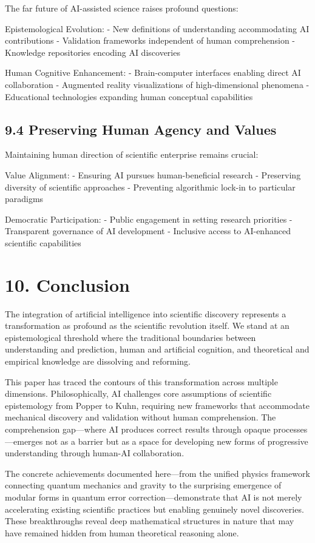 \documentclass{article}
\begin{document}
The far future of AI-assisted science raises profound questions:


Epistemological Evolution:
- New definitions of understanding accommodating AI contributions
- Validation frameworks independent of human comprehension
- Knowledge repositories encoding AI discoveries


Human Cognitive Enhancement:
- Brain-computer interfaces enabling direct AI collaboration
- Augmented reality visualizations of high-dimensional phenomena
- Educational technologies expanding human conceptual capabilities


\subsection{9.4 Preserving Human Agency and Values}

Maintaining human direction of scientific enterprise remains crucial:


Value Alignment:
- Ensuring AI pursues human-beneficial research
- Preserving diversity of scientific approaches
- Preventing algorithmic lock-in to particular paradigms


Democratic Participation:
- Public engagement in setting research priorities
- Transparent governance of AI development
- Inclusive access to AI-enhanced scientific capabilities


\section{10. Conclusion}

The integration of artificial intelligence into scientific discovery represents a transformation as profound as the scientific revolution itself. We stand at an epistemological threshold where the traditional boundaries between understanding and prediction, human and artificial cognition, and theoretical and empirical knowledge are dissolving and reforming.


This paper has traced the contours of this transformation across multiple dimensions. Philosophically, AI challenges core assumptions of scientific epistemology from Popper to Kuhn, requiring new frameworks that accommodate mechanical discovery and validation without human comprehension. The comprehension gap—where AI produces correct results through opaque processes—emerges not as a barrier but as a space for developing new forms of progressive understanding through human-AI collaboration.


The concrete achievements documented here—from the unified physics framework connecting quantum mechanics and gravity to the surprising emergence of modular forms in quantum error correction—demonstrate that AI is not merely accelerating existing scientific practices but enabling genuinely novel discoveries. These breakthroughs reveal deep mathematical structures in nature that may have remained hidden from human theoretical reasoning alone.
\end{document}
